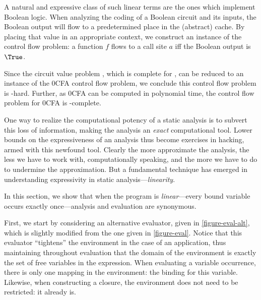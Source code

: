 A natural and expressive class of such linear terms are the ones which
implement Boolean logic.  When analyzing the coding of a Boolean
circuit and its inputs, the Boolean output will flow to a
predetermined place in the (abstract) cache.  By placing that value in
an appropriate context, we construct an instance of the control flow
problem: a function $f$ flows to a call site $a$ iff the Boolean
output is $\True$.

Since the circuit value problem \cite{ladner-75}, which is complete
for \ptime, can be reduced to an instance of the 0CFA control flow
problem, we conclude this control flow problem is \ptime-hard.
Further, as 0CFA can be computed in polynomial time, the control flow
problem for 0CFA is \ptime-complete.


One way to realize the computational potency of a static analysis is
to subvert this loss of information, making the analysis an {\em
exact} computational tool.  Lower bounds on the expressiveness of an
analysis thus become exercises in hacking, armed with this newfound
tool.  Clearly the more approximate the analysis, the less we have to
work with, computationally speaking, and the more we have to do to
undermine the approximation.  But a fundamental technique has emerged
in understanding expressivity in static analysis---{\em linearity}.


In this section, we show that when the program is {\em linear}---every
bound variable occurs exactly once---analysis and evaluation are
synonymous.

First, we start by considering an alternative evaluator, given in
\autoref{figure-eval-alt}, which is slightly modified from the one
given in \autoref{figure-eval}.  Notice that this evaluator
``tightens'' the environment in the case of an application, thus
maintaining throughout evaluation that the domain of the environment
is exactly the set of free variables in the expression.  When
evaluating a variable occurrence, there is only one mapping in the
environment: the binding for this variable. Likewise, when
constructing a closure, the environment does not need to be
restricted: it already is.



